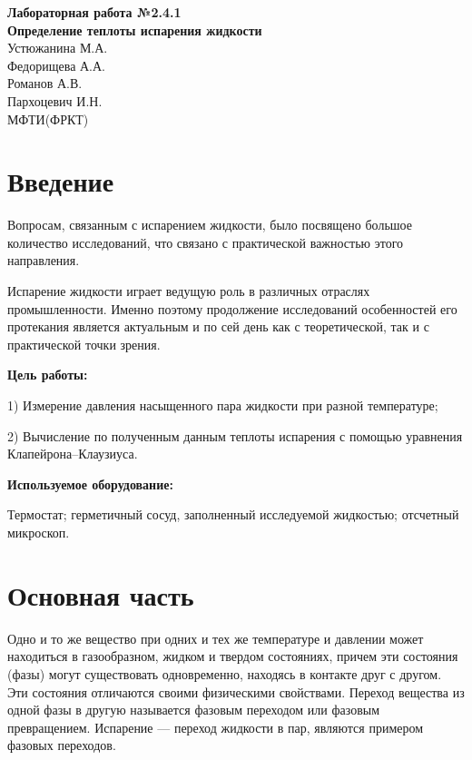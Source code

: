 \documentclass[a4paper,10pt]{article} %
\date{\today}
\begin{document}
\begin{center}
	\huge
	\textbf{Лабораторная работа №2.4.1\\Определение теплоты испарения жидкости\\}
	\footnotesize
	Устюжанина М.А.\\Федорищева А.А.\\Романов А.В.\\Пархоцевич И.Н.\\
	МФТИ(ФРКТ)
\end{center}

\section{Введение}

Вопросам, связанным с испарением жидкости, было посвящено большое количество исследований, что 
связано с практической важностью этого направления. 

Испарение жидкости играет ведущую роль в различных отраслях промышленности. Именно поэтому продолжение исследований 
особенностей его протекания является актуальным и по сей день как с теоретической, так и с практической точки 
зрения.

\textbf{Цель работы:}

1) Измерение давления насыщенного пара жидкости при разной температуре; 

2) Вычисление по полученным данным
теплоты испарения с помощью уравнения Клапейрона–Клаузиуса.

\textbf{Используемое оборудование:}

Термостат; герметичный сосуд, заполненный исследуемой жидкостью; отсчетный микроскоп.

\section{Основная часть}

Одно и то же вещество при одних и тех же температуре и давлении может находиться в газообразном, жидком и 
твердом состояниях, причем эти состояния (фазы) могут существовать одновременно, находясь в контакте друг с другом.
 Эти состояния отличаются своими физическими свойствами. Переход вещества из одной фазы в другую называется 
 фазовым переходом или фазовым превращением. Испарение — переход жидкости в пар, являются примером фазовых переходов. 
\end{document}
